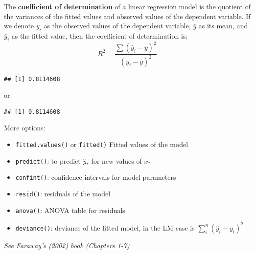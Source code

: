 \documentclass[]{article}
\newenvironment{Shaded}{\begin{snugshade}}{\end{snugshade}}
\newcommand{\KeywordTok}[1]{\textcolor[rgb]{0.13,0.29,0.53}{\textbf{{#1}}}}
\newcommand{\DecValTok}[1]{\textcolor[rgb]{0.00,0.00,0.81}{{#1}}}
\newcommand{\NormalTok}[1]{{#1}}
\numberwithin{equation}{section}
\begin{document}
The \textbf{coefficient of determination} of a linear regression model
is the quotient of the variances of the fitted values and observed
values of the dependent variable. If we denote \(y_i\) as the observed
values of the dependent variable, \(\bar{y}\) as its mean, and
\(\bar{y}_i\) as the fitted value, then the coefficient of determination
is: \[
    R^2 = \frac{\sum (\hat{y}_i-\bar{y})^2}{(y_i - \bar{y})^2}
\]

\begin{Shaded}
\end{Shaded}

\begin{verbatim}
## [1] 0.8114608
\end{verbatim}

or

\begin{Shaded}
\end{Shaded}

\begin{verbatim}
## [1] 0.8114608
\end{verbatim}

More options:

\begin{itemize}
\item
  \texttt{fitted.values()} or \texttt{fitted()} Fitted values of the
  model
\item
  \texttt{predict()}: to predict \(\hat{y}_*\) for new values of \(x_*\)
\item
  \texttt{confint()}: confidence intervals for model parameters
\item
  \texttt{resid()}: residuals of the model
\item
  \texttt{anova()}: ANOVA table for residuals
\item
  \texttt{deviance()}: deviance of the fitted model, in the LM case is
  \(\sum_i^{n}(\hat{y}_i - y_i)^2\)
\end{itemize}

\emph{See Faraway's (2002) book (Chapters 1-7)}
\end{document}
